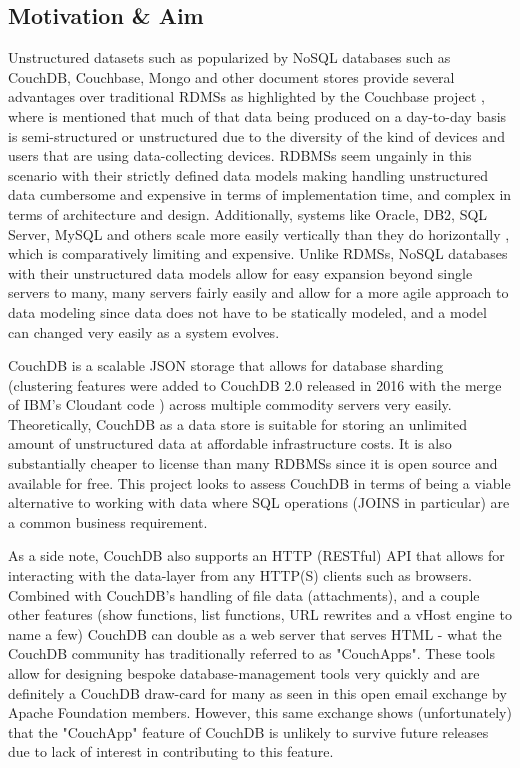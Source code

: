 % 

\subsection{Motivation \& Aim}
Unstructured datasets such as popularized by NoSQL databases such as CouchDB, Couchbase, Mongo and other document stores provide several advantages over traditional RDMSs as highlighted by the Couchbase project \cite{couchbaseWhitePaper}, where is mentioned that much of that data being produced on a day-to-day basis is semi-structured or unstructured due to the diversity of the kind of devices and users that are using data-collecting devices. RDBMSs seem ungainly in this scenario with their strictly defined data models making handling unstructured data cumbersome and expensive in terms of implementation time, and complex in terms of architecture and design. Additionally, systems like Oracle, DB2, SQL Server, MySQL and others scale more easily vertically than they do horizontally \cite{couchbaseWhitePaper}, which is comparatively limiting and expensive. Unlike RDMSs, NoSQL databases with their unstructured data models allow for easy expansion beyond single servers to many, many servers fairly easily and allow for a more agile approach to data modeling since data does not have to be statically modeled, and a model can changed very easily as a system evolves.

CouchDB is a scalable JSON storage that allows for database sharding (clustering features were added to CouchDB 2.0 released in 2016 with the merge of IBM's Cloudant code \cite{couchdb2.0}) across multiple commodity servers very easily. Theoretically, CouchDB as a data store is suitable for storing an unlimited amount of unstructured data at affordable infrastructure costs. It is also substantially cheaper to license than many RDBMSs since it is open source and available for free. This project looks to assess CouchDB in terms of being a viable alternative to working with data where SQL operations (JOINS in particular) are a common business requirement.

As a side note, CouchDB also supports an HTTP (RESTful) API that allows for interacting with the data-layer from any HTTP(S) clients such as browsers. Combined with CouchDB's handling of file data (attachments), and a couple other features (show functions, list functions, URL rewrites and a vHost engine to name a few) CouchDB can double as a web server that serves HTML - what the CouchDB community has traditionally referred to as "CouchApps". These tools allow for designing bespoke database-management tools very quickly and are definitely a CouchDB draw-card for many as seen in this open email exchange \cite{googleCon2017} by Apache Foundation members. However, this same exchange shows (unfortunately) that the "CouchApp" feature of CouchDB is unlikely to survive future releases due to lack of interest in contributing to this feature.